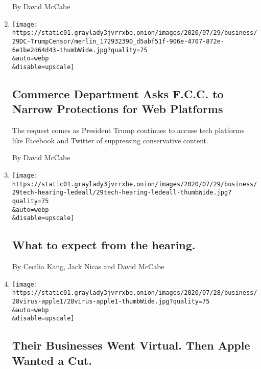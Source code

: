 \begin{enumerate}
  By David McCabe
\item
  \href{/2020/07/29/technology/trump-fcc-twitter-facebook.html}{}

  \texttt{[image: https://static01.graylady3jvrrxbe.onion/images/2020/07/29/business/29DC-TrumpCensor/merlin\_172932390\_d5abf51f-906e-4707-872e-6e1be2d64d43-thumbWide.jpg?quality=75\\\&auto=webp\\\&disable=upscale]}

  \hypertarget{commerce-department-asks-fcc-to-narrow-protections-for-web-platforms}{%
  \subsection{Commerce Department Asks F.C.C. to Narrow Protections for
  Web
  Platforms}\label{commerce-department-asks-fcc-to-narrow-protections-for-web-platforms}}

  The request comes as President Trump continues to accuse tech
  platforms like Facebook and Twitter of suppressing conservative
  content.

  By David McCabe
\item
  \href{/live/2020/07/29/technology/tech-ceos-hearing-testimony/what-to-expect-from-the-hearing}{}

  \texttt{[image: https://static01.graylady3jvrrxbe.onion/images/2020/07/29/business/29tech-hearing-ledeall/29tech-hearing-ledeall-thumbWide.jpg?quality=75\\\&auto=webp\\\&disable=upscale]}

  \hypertarget{what-to-expect-from-the-hearing}{%
  \subsection{What to expect from the
  hearing.}\label{what-to-expect-from-the-hearing}}

  By Cecilia Kang, Jack Nicas and David McCabe
\item
  \href{/2020/07/28/technology/apple-app-store-airbnb-classpass.html}{}

  \texttt{[image: https://static01.graylady3jvrrxbe.onion/images/2020/07/28/business/28virus-apple1/28virus-apple1-thumbWide.jpg?quality=75\\\&auto=webp\\\&disable=upscale]}

  \hypertarget{their-businesses-went-virtual-then-apple-wanted-a-cut}{%
  \subsection{Their Businesses Went Virtual. Then Apple Wanted a
  Cut.}\label{their-businesses-went-virtual-then-apple-wanted-a-cut}}


\end{enumerate}
